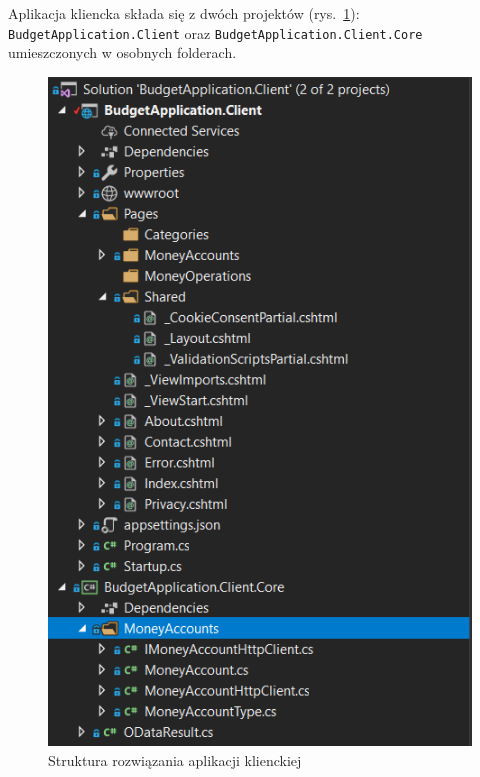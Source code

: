 Aplikacja kliencka składa się z dwóch projektów (rys.~\ref{fig:fiz-client-2}): \texttt{BudgetApplication.Client} oraz \texttt{BudgetApplication.Client.Core} umieszczonych w osobnych folderach. 
\begin{figure}[htb]
	\centering
	\includegraphics[scale=.77]{rys04/struktura-fizyczna-client-2.PNG}
	\caption{Struktura rozwiązania aplikacji klienckiej}
	\label{fig:fiz-client-2}
\end{figure}

